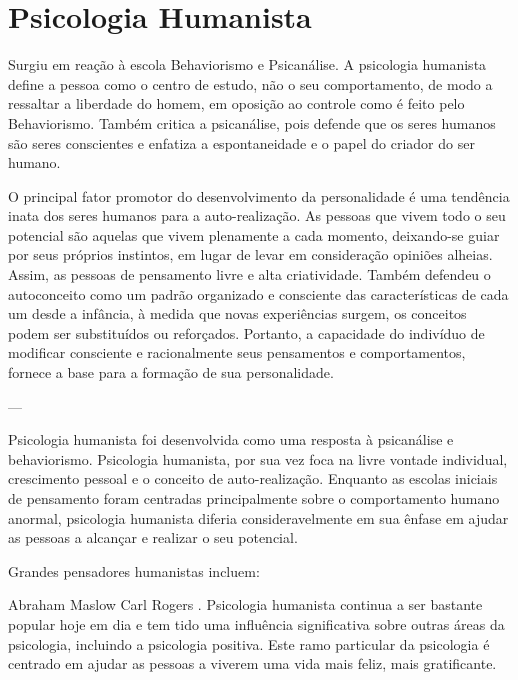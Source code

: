 \section{Psicologia Humanista}\label{humanismo}

Surgiu em reação à escola Behaviorismo e Psicanálise. 
A psicologia humanista define a pessoa como o centro de estudo, não o seu comportamento, de modo a ressaltar a liberdade do homem, em oposição ao controle como é feito pelo Behaviorismo.
Também critica a psicanálise, pois defende que os seres humanos são seres conscientes e enfatiza a espontaneidade e o papel do criador do ser humano.

O principal fator promotor do desenvolvimento da personalidade é uma tendência inata dos seres humanos para a auto-realização. 
As pessoas que vivem todo o seu potencial são aquelas que vivem plenamente a cada momento, deixando-se guiar por seus próprios instintos, em lugar de levar em consideração opiniões alheias. 
Assim, as pessoas de pensamento livre e alta criatividade.
Também defendeu o autoconceito como um padrão organizado e consciente das características de cada um desde a infância, à medida que novas experiências surgem, os conceitos podem ser substituídos ou reforçados. 
Portanto, a capacidade do indivíduo de modificar consciente e racionalmente seus pensamentos e comportamentos, fornece a base para a formação de sua personalidade. 


---

Psicologia humanista foi desenvolvida como uma resposta à psicanálise e behaviorismo. Psicologia humanista, por sua vez foca na livre vontade individual, crescimento pessoal e o conceito de auto-realização. Enquanto as escolas iniciais de pensamento foram centradas principalmente sobre o comportamento humano anormal, psicologia humanista diferia consideravelmente em sua ênfase em ajudar as pessoas a alcançar e realizar o seu potencial.

Grandes pensadores humanistas incluem:

Abraham Maslow
Carl Rogers .
Psicologia humanista continua a ser bastante popular hoje em dia e tem tido uma influência significativa sobre outras áreas da psicologia, incluindo a psicologia positiva. Este ramo particular da psicologia é centrado em ajudar as pessoas a viverem uma vida mais feliz, mais gratificante.